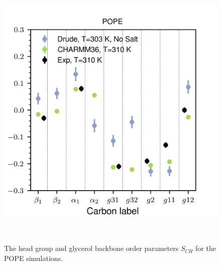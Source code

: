 \documentclass[journal=jacsat,manuscript=article,layout=singlecolumn]{achemso}
\begin{document}
\begin{figure}[!hbt]
	\centering
	\includegraphics{pope_order_parameters.png}
	\caption{The head group and glycerol backbone order parameters $S_{CH}$ for the POPE simulations.}
	\label{fig:pope_order}
         \\
\end{figure}
\end{document}
